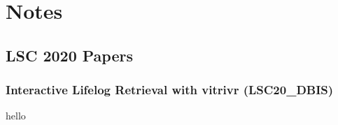 \chapter{Notes}

\section{LSC 2020 Papers}

\subsection{Interactive Lifelog Retrieval with vitrivr (LSC20\_DBIS)}
hello